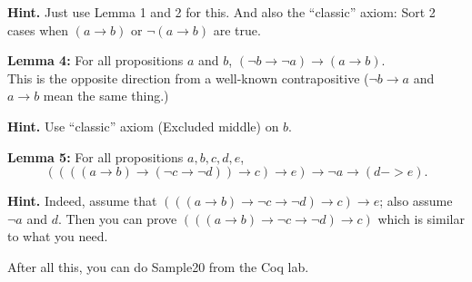 \documentclass[jou]{apa6}
\begin{document}
{\bf Hint.} Just use Lemma 1 and 2 for this. And also the ``classic'' axiom: Sort 2 cases when $(a \rightarrow b)$
or $\neg (a \rightarrow b)$ are true.


{\bf Lemma 4:} For all propositions $a$ and $b$, $(\neg b \rightarrow \neg a) \rightarrow (a \rightarrow b)$.\\
This is the opposite direction from a well-known contrapositive ($\neg b \rightarrow a$ and $a \rightarrow b$
mean the same thing.)

{\bf Hint.} Use ``classic'' axiom (Excluded middle) on $b$. 

{\bf Lemma 5:} For all propositions $a,b,c,d,e$, 
$$((((a \rightarrow b) \rightarrow  (\neg c \rightarrow  \neg d)) \rightarrow  c) \rightarrow  e) \rightarrow \neg  a \rightarrow  (d -> e).$$

{\bf Hint.} Indeed, assume that $(((a \rightarrow  b) \rightarrow  \neg c \rightarrow  \neg d)\rightarrow  c) \rightarrow  e$; 
also assume $\neg a$ and $d$. Then you can prove $(((a \rightarrow b) \rightarrow \neg c \rightarrow \neg d) \rightarrow c)$ which is similar to what you need.

After all this, you can do Sample20 from the Coq lab.
\end{document}
